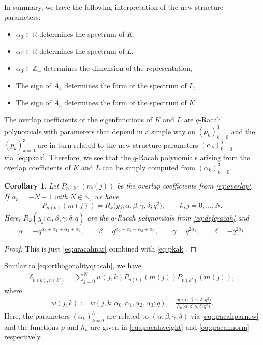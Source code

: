 \documentclass[pdftex]{sigma}
\numberwithin{equation}{section}
\newtheorem{Corollary}[Theorem]{Corollary}
\newcommand{\RR}{\mathbb{R}}
\newcommand{\ZZ}{\mathbb{Z}}
\newcommand{\NN}{\mathbb{N}}
\begin{document}
In summary, we have the following interpretation of the new structure parameters:
\begin{itemize}\itemsep=0pt
	\item $\alpha_0\in\RR$ determines the spectrum of $K$,
	\item $\alpha_1\in\RR$ determines the spectrum of $L$,
	\item $\alpha_3\in\ZZ_+$ determines the dimension of the representation,
	\item The sign of $A_4$ determines the form of the spectrum of $L$,
	\item The sign of $A_5$ determines the form of the spectrum of $K$.
\end{itemize}
The overlap coefficients of the eigenfunctions of $K$ and $L$ are $q$-Racah polynomials with parameters that depend in a simple way on $(p_k)_{k=0}^3$ and the $(p_k)_{k=0}^3$ are in turn related to the new structure parameters $(\alpha_k)_{k=0}^3$ via~\eqref{eq:pkak}. Therefore, we see that the $q$-Racah polynomials arising from the overlap coefficients of $K$ and $L$ can be simply computed from $(\alpha_k)_{k=0}^3$.
\begin{Corollary}
	Let $P_{n(k)}(m(j))$ be the overlap coefficients from \eqref{eq:overlap}. If $\alpha_3=-N-1$ with $N\in\NN$, we have
\[
P_{n(k)}(m(j))=R_k\big(y_j;\alpha,\beta,\gamma,\delta;q^2\big),\qquad k,j=0,\dots,N.
\]
	Here, $R_k(y_j;\alpha,\beta,\gamma,\delta;q)$ are the $q$-Racah polynomials from \eqref{eq:defqracah} and
\begin{gather}
\alpha=-q^{\alpha_0+\alpha_1+\alpha_2+\alpha_3},\qquad \beta=q^{\alpha_0-\alpha_1-\alpha_2+\alpha_3},\qquad \gamma=q^{2\alpha_3},\qquad \delta=-q^{2\alpha_1}. \label{eq:qracahparnew}
\end{gather}
\end{Corollary}
\begin{proof}
This is just \eqref{eq:qracahpar} combined with \eqref{eq:pkak}.
\end{proof}

Similar to \eqref{eq:orthogonalityqracah}, we have
\begin{gather*}
	\delta_{n(k),n(k')}=\sum_{j=0}^N w(j,k)P_{n(k)}(m(j))\overline{P_{n(k')}(m(j))},
\end{gather*}
where
\begin{gather}
w(j,k):=w(j,k,\alpha_0,\alpha_1,\alpha_2,\alpha_3;q) =\frac{\rho\big(j,\alpha,\beta,\gamma,\delta;q^2\big)}{h_n\big(\alpha,\beta,\gamma,\delta:q^2\big)}.\label{eq:weightqracahnew}
\end{gather}
Here, the parameters $(\alpha_k)_{k=0}^3$ are related to $(\alpha,\beta,\gamma,\delta)$ via \eqref{eq:qracahparnew} and the functions $\rho$ and $h_n$ are given in \eqref{eq:qracahweight} and \eqref{eq:qracahnorm} respectively.
\end{document}
